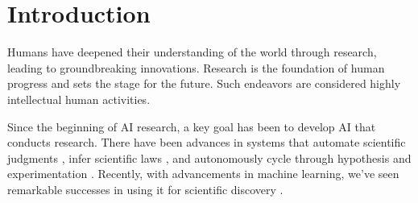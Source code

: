 \chapter{Introduction}
Humans have deepened their understanding of the world through research, leading to groundbreaking innovations. Research is the foundation of human progress and sets the stage for the future. Such endeavors are considered highly intellectual human activities.

Since the beginning of AI research, a key goal has been to develop AI that conducts research. There have been advances in systems that automate scientific judgments \cite{lindsay1993dendral}, infer scientific laws \cite{langley1987scientific}, and autonomously cycle through hypothesis and experimentation \cite{king2004functional}. Recently, with advancements in machine learning, we've seen remarkable successes in using it for scientific discovery \cite{wang2023scientific,xu2021artificial,zhang2023artificial}.

